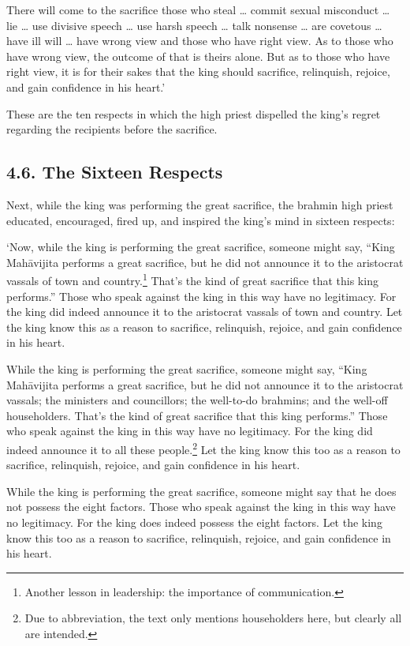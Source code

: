 \documentclass[12pt,openany]{book}%
\begin{document}
There will come to the sacrifice those who steal … commit sexual misconduct … lie … use divisive speech … use harsh speech … talk nonsense … are covetous … have ill will … have wrong view and those who have right view. As to those who have wrong view, the outcome of that is theirs alone. But as to those who have right view, it is for their sakes that the king should sacrifice, relinquish, rejoice, and gain confidence in his heart.’ 

These are the ten respects in which the high priest dispelled the king’s regret regarding the recipients before the sacrifice. 

\subsection*{4.6. The Sixteen Respects }

Next, while the king was performing the great sacrifice, the brahmin high priest educated, encouraged, fired up, and inspired the king’s mind in sixteen respects: 

‘Now, while the king is performing the great sacrifice, someone might say, “King \textsanskrit{Mahāvijita} performs a great sacrifice, but he did not announce it to the aristocrat vassals of town and country.\footnote{Another lesson in leadership: the importance of communication. } That’s the kind of great sacrifice that this king performs.” Those who speak against the king in this way have no legitimacy. For the king did indeed announce it to the aristocrat vassals of town and country. Let the king know this as a reason to sacrifice, relinquish, rejoice, and gain confidence in his heart. 

While the king is performing the great sacrifice, someone might say, “King \textsanskrit{Mahāvijita} performs a great sacrifice, but he did not announce it to the aristocrat vassals; the ministers and councillors; the well-to-do brahmins; and the well-off householders. That’s the kind of great sacrifice that this king performs.” Those who speak against the king in this way have no legitimacy. For the king did indeed announce it to all these people.\footnote{Due to abbreviation, the text only mentions householders here, but clearly all are intended. } Let the king know this too as a reason to sacrifice, relinquish, rejoice, and gain confidence in his heart. 

While the king is performing the great sacrifice, someone might say that he does not possess the eight factors. Those who speak against the king in this way have no legitimacy. For the king does indeed possess the eight factors. Let the king know this too as a reason to sacrifice, relinquish, rejoice, and gain confidence in his heart. 
\end{document}
